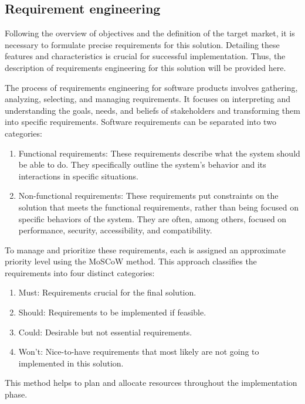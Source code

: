 \subsection{Requirement engineering}

Following the overview of objectives and the definition of the target market, it is necessary to formulate precise requirements for this solution. Detailing these features and characteristics is crucial for successful implementation. Thus, the description of requirements engineering for this solution will be provided here.

The process of requirements engineering for software products involves gathering, analyzing, selecting, and managing requirements. It focuses on interpreting and understanding the goals, needs, and beliefs of stakeholders and transforming them into specific requirements.
Software requirements can be separated into two categories: \cite{Aurum2005}
\begin{enumerate}
    \item Functional requirements: These requirements describe what the system should be able to do. They specifically outline the system's behavior and its interactions in specific situations.
    \item Non-functional requirements: These requirements put constraints on the solution that meets the functional requirements, rather than being focused on specific behaviors of the system. They are often, among others, focused on performance, security, accessibility, and compatibility.
\end{enumerate}

To manage and prioritize these requirements, each is assigned an approximate priority level using the MoSCoW method. This approach classifies the requirements into four distinct categories: \cite{Kravchenko2022}
\begin{enumerate}
    \item Must: Requirements crucial for the final solution.
    \item Should: Requirements to be implemented if feasible.
    \item Could: Desirable but not essential requirements.
    \item Won't: Nice-to-have requirements that most likely are not going to implemented in this solution.
\end{enumerate}
This method helps to plan and allocate resources throughout the implementation phase.

